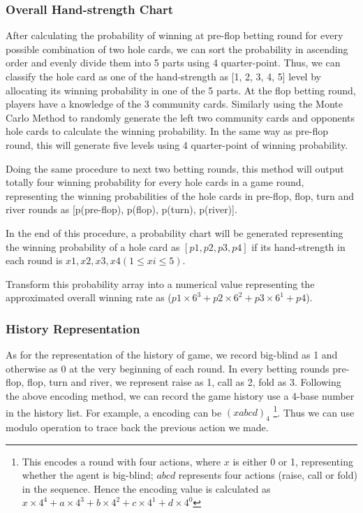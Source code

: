 \documentclass{article}
\begin{document}
\subsubsection{Overall Hand-strength Chart}

After calculating the probability of winning at pre-flop betting round for every possible combination of two hole cards, we can sort the probability in ascending order and evenly divide them into 5 parts using 4 quarter-point. Thus, we can classify the hole card as one of the hand-strength as [1, 2, 3, 4, 5] level by allocating its winning probability in one of the 5 parts. 
At the flop betting round, players have a knowledge of the 3 community cards. Similarly using the Monte Carlo Method to randomly generate the left two community cards and opponents hole cards to calculate the winning probability. In the same way as pre-flop round, this will generate five levels using 4 quarter-point of winning probability\cite{carmelo}.

Doing the same procedure to next two betting rounds, this method will output totally four winning probability for every hole cards in a game round, representing the winning probabilities of the hole cards in pre-flop, flop, turn and river rounds as [p(pre-flop), p(flop), p(turn), p(river)].

In the end of this procedure, a probability chart will be generated representing the winning probability of a hole card as $[p1, p2, p3, p4]$ if its hand-strength in each round is $x1, x2 ,x3 ,x4 (1\leq xi\leq5)$.

Transform this probability array into a numerical value representing the approximated overall winning rate as ($p1\times6^3 + p2\times6^2 + p3\times6^1 + p4$).


\subsubsection{History Representation}

As for the representation of the history of game, we record big-blind as 1 and otherwise as 0 at the very beginning of each round. In every betting rounds pre-flop, flop, turn and river, we represent raise as 1, call as 2, fold as 3. Following the above encoding method, we can record the game history use a 4-base number in the history list. For example, a encoding can be $(xabcd)_4$  
\footnote{This encodes a round with four actions, where $x$ is either 0 or 1, representing whether the agent is big-blind; $abcd$ represents four actions (raise, call or fold) in the sequence. Hence the encoding value is calculated as $x\times4^4+ a\times4^3 + b \times 4^2+ c\times4^1+d\times4^0 $}.
Thus we can use modulo operation to trace back the previous action we made.
\end{document}
